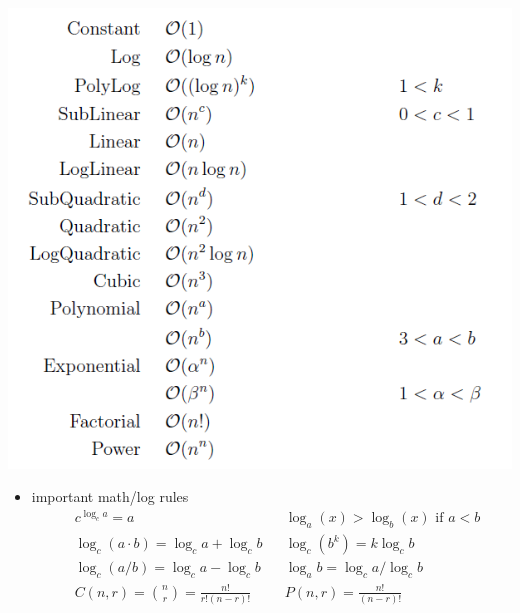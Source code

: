     \includegraphics[scale = 0.7]{pictures/functions growth.png}
    \begin{itemize}
    \item important math/log rules
    \begin{align*}
        &c^{\log_c a} = a                   &&\log_a(x) > \log_b(x) \text{ if } a < b \\
        &\log_c (a \cdot b) = \log_c a + \log_c b           &&\log_c (b^k) = k \log_c b \\
        &\log_c (a / b) = \log_c a - \log_c b               &&\log_a b = {\log_c a}/{\log_c b}   \\
        &C(n,r) = {n \choose r} = \frac{n!}{r!(n-r)!}              && P(n,r) = \frac{n!}{(n-r)!}
    \end{align*}
    
\end{itemize}